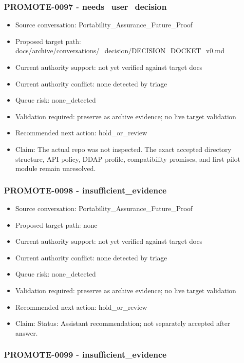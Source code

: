 \documentclass[11pt,a4paper]{report}
\begin{document}
\subsubsection{PROMOTE-0097 - needs\_user\_decision}

\begin{itemize}
\item Source conversation: Portability\_Assurance\_Future\_Proof
\item Proposed target path: docs/archive/conversations/\_decision/DECISION\_DOCKET\_v0.md
\item Current authority support: not yet verified against target docs
\item Current authority conflict: none detected by triage
\item Queue risk: none\_detected
\item Validation required: preserve as archive evidence; no live target validation
\item Recommended next action: hold\_or\_review
\item Claim: The actual repo was not inspected. The exact accepted directory structure, API policy, DDAP profile, compatibility promises, and first pilot module remain unresolved.
\end{itemize}

\subsubsection{PROMOTE-0098 - insufficient\_evidence}

\begin{itemize}
\item Source conversation: Portability\_Assurance\_Future\_Proof
\item Proposed target path: none
\item Current authority support: not yet verified against target docs
\item Current authority conflict: none detected by triage
\item Queue risk: none\_detected
\item Validation required: preserve as archive evidence; no live target validation
\item Recommended next action: hold\_or\_review
\item Claim: Status: Assistant recommendation; not separately accepted after answer.
\end{itemize}

\subsubsection{PROMOTE-0099 - insufficient\_evidence}
\end{document}
